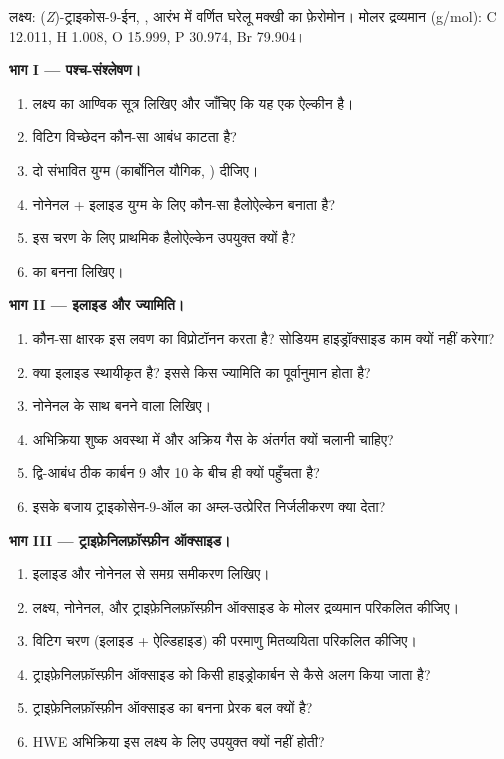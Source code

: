\begin{problem}
\label{pb:b2:wittig:1}
लक्ष्य: (\textit{Z})-ट्राइकोस-9-ईन, , आरंभ में वर्णित घरेलू मक्खी का
फ़ेरोमोन। मोलर द्रव्यमान (\unit{g/mol}): C 12.011, H 1.008, O 15.999, P 30.974, Br 79.904।

\medskip
\noindent\textbf{भाग I --- पश्च-संश्लेषण।}
\begin{enumerate}
  \item लक्ष्य का आण्विक सूत्र लिखिए और जाँचिए कि यह एक ऐल्कीन है।
  \item विटिग विच्छेदन कौन-सा आबंध काटता है?
  \item दो संभावित युग्म (कार्बोनिल यौगिक, ) दीजिए।
  \item नोनेनल + इलाइड युग्म के लिए कौन-सा हैलोऐल्केन  बनाता है?
  \item इस चरण के लिए प्राथमिक हैलोऐल्केन उपयुक्त क्यों है?
  \item {} का बनना लिखिए।
\end{enumerate}

\medskip
\noindent\textbf{भाग II --- इलाइड और ज्यामिति।}
\begin{enumerate}[resume]
  \item कौन-सा क्षारक इस लवण का विप्रोटॉनन करता है? सोडियम हाइड्रॉक्साइड काम क्यों नहीं करेगा?
  \item क्या इलाइड स्थायीकृत है? इससे किस ज्यामिति का पूर्वानुमान होता है?
  \item नोनेनल के साथ बनने वाला  लिखिए।
  \item अभिक्रिया शुष्क अवस्था में और अक्रिय गैस के अंतर्गत क्यों चलानी चाहिए?
  \item द्वि-आबंध ठीक कार्बन 9 और 10 के बीच ही क्यों पहुँचता है?
  \item इसके बजाय ट्राइकोसेन-9-ऑल का अम्ल-उत्प्रेरित निर्जलीकरण क्या देता?
\end{enumerate}

\medskip
\noindent\textbf{भाग III --- ट्राइफ़ेनिलफ़ॉस्फ़ीन ऑक्साइड।}
\begin{enumerate}[resume]
  \item इलाइड और नोनेनल से समग्र समीकरण लिखिए।
  \item लक्ष्य, नोनेनल,  और
        ट्राइफ़ेनिलफ़ॉस्फ़ीन ऑक्साइड के मोलर द्रव्यमान परिकलित कीजिए।
  \item विटिग चरण (इलाइड + ऐल्डिहाइड) की परमाणु मितव्ययिता परिकलित कीजिए।
  \item ट्राइफ़ेनिलफ़ॉस्फ़ीन ऑक्साइड को किसी हाइड्रोकार्बन से कैसे अलग किया जाता है?
  \item ट्राइफ़ेनिलफ़ॉस्फ़ीन ऑक्साइड का बनना प्रेरक बल क्यों है?
  \item HWE अभिक्रिया इस लक्ष्य के लिए उपयुक्त क्यों नहीं होती?
\end{enumerate}


\end{problem}
